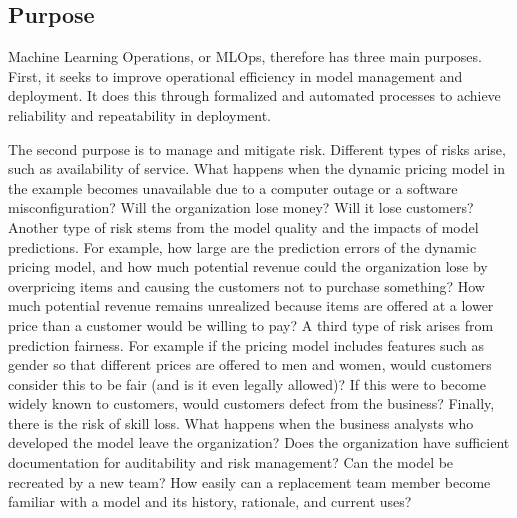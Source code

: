 \subsection*{Purpose}

Machine Learning Operations, or MLOps, therefore has three main purposes. First, it seeks to improve operational efficiency in model management and deployment. It does this through formalized and automated processes to achieve reliability and repeatability in deployment. 

The second purpose is to manage and mitigate risk. Different types of risks arise, such as availability of service. What happens when the dynamic pricing model in the example becomes unavailable due to a computer outage or a software misconfiguration? Will the organization lose money? Will it lose customers? Another type of risk stems from the model quality and the impacts of model predictions. For example, how large are the prediction errors of the dynamic pricing model, and how much potential revenue could the organization lose by overpricing items and causing the customers not to purchase something? How much potential revenue remains unrealized because items are offered at a lower price than a customer would be willing to pay? A third type of risk arises from prediction fairness. For example if the pricing model includes features such as gender so that different prices are offered to men and women, would customers consider this to be fair (and is it even legally allowed)? If this were to become widely known to customers, would customers defect from the business? Finally, there is the risk of skill loss. What happens when the business analysts who developed the model leave the organization? Does the organization have sufficient documentation for auditability and risk management? Can the model be recreated by a new team? How easily can a replacement team member become familiar with a model and its history, rationale, and current uses?

